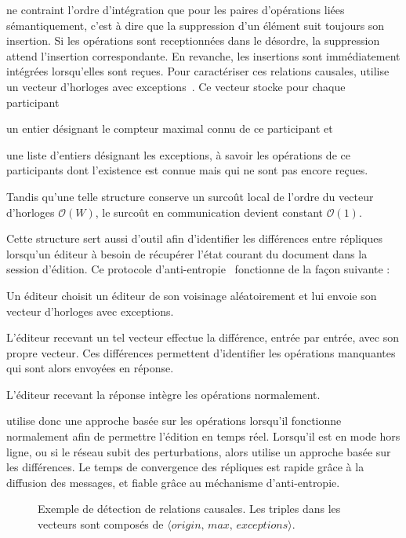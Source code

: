 \CRATE ne contraint l'ordre d'intégration que pour les paires d'opérations liées
sémantiquement, c'est à dire que la suppression d'un élément suit toujours son
insertion. Si les opérations sont receptionnées dans le désordre, la suppression
attend l'insertion correspondante. En revanche, les insertions sont
immédiatement intégrées lorsqu'elles sont reçues. Pour caractériser ces
relations causales, \CRATE utilise un vecteur d'horloges avec
exceptions~\cite{malkhi2007concise, mukund2014optimized}. Ce vecteur stocke pour
chaque participant
\begin{inparaenum}
\item un entier désignant le compteur maximal connu de ce participant et
\item une liste d'entiers désignant les exceptions, à savoir les opérations de
  ce participants dont l'existence est connue mais qui ne sont pas encore
  reçues.
\end{inparaenum}
Tandis qu'une telle structure conserve un surcoût local de l'ordre du vecteur
d'horloges $\mathcal{O}(W)$, le surcoût en communication devient constant
$\mathcal{O}(1)$.

Cette structure sert aussi d'outil afin d'identifier les différences entre
répliques lorsqu'un éditeur à besoin de récupérer l'état courant du document
dans la session d'édition. Ce protocole
d'anti-entropie~\cite{demers1987epidemic} fonctionne de la façon suivante :
\begin{inparaenum}
\item Un éditeur choisit un éditeur de son voisinage aléatoirement et lui envoie
  son vecteur d'horloges avec exceptions.
\item L'éditeur recevant un tel vecteur effectue la différence, entrée par
  entrée, avec son propre vecteur. Ces différences permettent d'identifier les
  opérations manquantes qui sont alors envoyées en réponse.
\item L'éditeur recevant la réponse intègre les opérations normalement.
\end{inparaenum}

\CRATE utilise donc une approche basée sur les opérations lorsqu'il fonctionne
normalement afin de permettre l'édition en temps réel. Lorsqu'il est en mode
hors ligne, ou si le réseau subit des perturbations, alors \CRATE utilise un
approche basée sur les différences. Le temps de convergence des répliques est
rapide grâce à la diffusion des messages, et fiable grâce au méchanisme
d'anti-entropie.

\begin{figure}
  \begin{center}
    
    \caption[Exemple de détection de relations causales]
    {\label{editor:fig:timeline}Exemple de détection de relations causales. Les
      triples dans les vecteurs sont composés de
      $\langle origin,\, max,\, exceptions\rangle$.}
  \end{center}
\end{figure}

